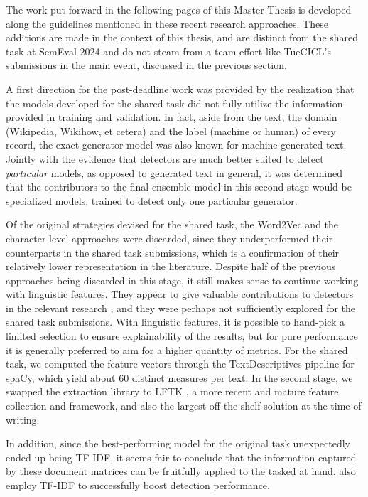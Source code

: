 The work put forward in the following pages of this Master Thesis is developed along the guidelines mentioned in these recent research approaches.
These additions are made in the context of this thesis, and are distinct from the shared task at SemEval-2024 and do not steam from a team effort like TueCICL's submissions in the main event, discussed in the previous section.

A first direction for the post-deadline work was provided by the realization that the models developed for the shared task did not fully utilize the information provided in training and validation.
In fact, aside from the text, the domain (Wikipedia, Wikihow, et cetera) and the label (machine or human) of every record, the exact generator model was also known for machine-generated text.
Jointly with the evidence that detectors are much better suited to detect \emph{particular} models, as opposed to generated text in general, it was determined that the contributors to the final ensemble model in this second stage would be specialized models, trained to detect only one particular generator.

Of the original strategies devised for the shared task, the Word2Vec and the character-level approaches were discarded, since they underperformed their counterparts in the shared task submissions, which is a confirmation of their relatively lower representation in the literature.
Despite half of the previous approaches being discarded in this stage, it still makes sense to continue working with linguistic features.
They appear to give valuable contributions to detectors in the relevant research \citep{frohling2021feature}, and they were perhaps not sufficiently explored for the shared task submissions.
With linguistic features, it is possible to hand-pick a limited selection to ensure explainability of the results, but for pure performance it is generally preferred to aim for a higher quantity of metrics.
For the shared task, we computed the feature vectors through the TextDescriptives pipeline \citep{Hansen_2023} for spaCy, which yield about 60 distinct measures per text.
In the second stage, we swapped the extraction library to LFTK \citep{lee2023lftkhandcraftedfeaturescomputational}, a more recent and mature feature collection and framework, and also the largest off-the-shelf solution at the time of writing.

In addition, since the best-performing model for the original task unexpectedly ended up being TF-IDF, it seems fair to conclude that the information captured by these document matrices can be fruitfully applied to the tasked at hand.
\citet{frohling2021feature} also employ TF-IDF to successfully boost detection performance.

